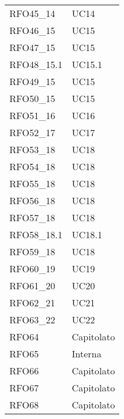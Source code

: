 \begin{longtable}{|C{6cm} C{3cm}|}
    RFO45\_14 & UC14 \\
    
    RFO46\_15 & UC15 \\
    
    RFO47\_15 & UC15 \\
    
    RFO48\_15.1 & UC15.1 \\
    
    RFO49\_15 & UC15 \\
    
    RFO50\_15 & UC15 \\
    
    RFO51\_16 & UC16 \\
    
    RFO52\_17 & UC17 \\
    
    RFO53\_18 & UC18 \\
    
    RFO54\_18 & UC18 \\
    
    RFO55\_18 & UC18 \\
    
    RFO56\_18 & UC18 \\
    
    RFO57\_18 & UC18 \\
    
    RFO58\_18.1 & UC18.1 \\
    
    RFO59\_18 & UC18 \\
    
    RFO60\_19 & UC19 \\
    
    RFO61\_20 & UC20 \\
    
    RFO62\_21 & UC21 \\
    
    RFO63\_22 & UC22 \\

    RFO64 & Capitolato \\
    
    RFO65 & Interna \\
    
    RFO66 & Capitolato \\
    
    RFO67 & Capitolato \\
        
    RFO68 & Capitolato \\
    

\end{longtable}
